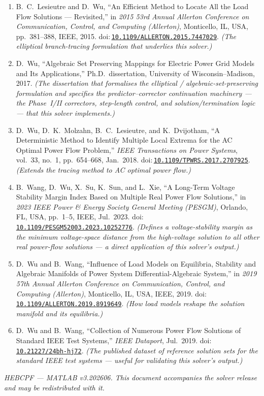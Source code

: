 \documentclass[11pt,a4paper]{article}
\newcommand{\doi}[1]{\href{https://doi.org/#1}{\nolinkurl{#1}}}
\begin{document}
\begin{enumerate}[leftmargin=1.6em]
\item B.\ C.\ Lesieutre and D.\ Wu, ``An Efficient Method to Locate All the Load Flow
      Solutions --- Revisited,'' in \emph{2015 53rd Annual Allerton Conference on
      Communication, Control, and Computing (Allerton)}, Monticello, IL, USA, pp.~381--388,
      IEEE, 2015. doi:\,\doi{10.1109/ALLERTON.2015.7447029}. \emph{(The elliptical
      branch-tracing formulation that underlies this solver.)}
\item D.\ Wu, ``Algebraic Set Preserving Mappings for Electric Power Grid Models and Its
      Applications,'' Ph.D.\ dissertation, University of Wisconsin--Madison, 2017.
      \emph{(The dissertation that formalises the elliptical / algebraic-set-preserving
      formulation and specifies the predictor--corrector continuation machinery --- the
      Phase~I/II correctors, step-length control, and solution/termination logic --- that
      this solver implements.)}
\item D.\ Wu, D.\ K.\ Molzahn, B.\ C.\ Lesieutre, and K.\ Dvijotham, ``A Deterministic
      Method to Identify Multiple Local Extrema for the AC Optimal Power Flow Problem,''
      \emph{IEEE Transactions on Power Systems}, vol.~33, no.~1, pp.~654--668, Jan.\ 2018.
      doi:\,\doi{10.1109/TPWRS.2017.2707925}.
      \emph{(Extends the tracing method to AC optimal power flow.)}
\item B.\ Wang, D.\ Wu, X.\ Su, K.\ Sun, and L.\ Xie, ``A Long-Term Voltage Stability
      Margin Index Based on Multiple Real Power Flow Solutions,'' in \emph{2023 IEEE Power
      \& Energy Society General Meeting (PESGM)}, Orlando, FL, USA, pp.~1--5, IEEE,
      Jul.\ 2023. doi:\,\doi{10.1109/PESGM52003.2023.10252776}.
      \emph{(Defines a voltage-stability margin as the
      minimum voltage-space distance from the high-voltage solution to all other real
      power-flow solutions --- a direct application of this solver's output.)}
\item D.\ Wu and B.\ Wang, ``Influence of Load Models on Equilibria, Stability and
      Algebraic Manifolds of Power System Differential-Algebraic System,'' in \emph{2019
      57th Annual Allerton Conference on Communication, Control, and Computing
      (Allerton)}, Monticello, IL, USA, IEEE, 2019.
      doi:\,\doi{10.1109/ALLERTON.2019.8919649}. \emph{(How load models reshape the
      solution manifold and its equilibria.)}
\item D.\ Wu and B.\ Wang, ``Collection of Numerous Power Flow Solutions of Standard IEEE
      Test Systems,'' \emph{IEEE Dataport}, Jul.\ 2019.
      doi:\,\doi{10.21227/24bh-hj72}. \emph{(The published dataset of reference solution
      sets for the standard IEEE test systems --- useful for validating this solver's
      output.)}
\end{enumerate}

\vfill
\begin{center}\small\itshape
HEBCPF --- MATLAB v3.202606. This document accompanies the solver release and may be
redistributed with it.
\end{center}
\end{document}
